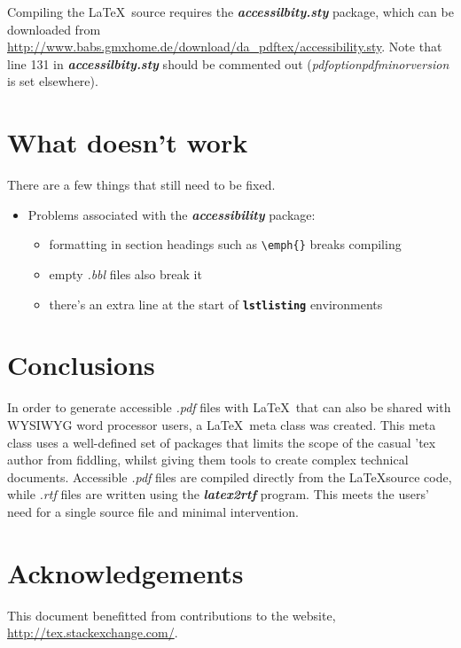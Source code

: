 \documentclass[12pt,letterpaper]{article}
\newcommand{\fn}[1]{\emph{#1}}
\newcommand{\packagename}[1]{\textbf{\emph{#1}}}
\newcommand{\envname}[1]{\textbf{\texttt{#1}}}
\begin{document}
Compiling the \LaTeX\ source requires the \packagename{accessilbity.sty} package, which can be downloaded from \href{http://www.babs.gmxhome.de/download/da_pdftex/accessibility.sty}{http://www.babs.gmxhome.de/download/da\_pdftex/accessibility.sty}. Note that line 131 in \packagename{accessilbity.sty} should be commented out (\fn{pdfoptionpdfminorversion} is set elsewhere).

\section{What doesn't work}
There are a few things that still need to be fixed.

\begin{itemize}
\item Problems associated with the \packagename{accessibility} package:
\begin{itemize}
\item formatting in section headings such as \verb+\emph{}+ breaks compiling
\item empty \fn{.bbl} files also break it
\item there's an extra line at the start of \envname{lstlisting} environments
\end{itemize}
\end{itemize}

\section{Conclusions}
In order to generate accessible \fn{.pdf} files with \LaTeX\ that can also be shared with WYSIWYG word processor users, a \LaTeX\ meta class was created. This meta class uses a well-defined set of packages that limits the scope of the casual 'tex author from fiddling, whilst giving them tools to create complex technical documents. Accessible \fn{.pdf} files are compiled directly from the \LaTeX source code, while \fn{.rtf} files are written using the \packagename{latex2rtf} program. This meets the users' need for a single source file and minimal intervention.

\section*{Acknowledgements}
This document benefitted from contributions to the website, \url{http://tex.stackexchange.com/}.
\end{document}
